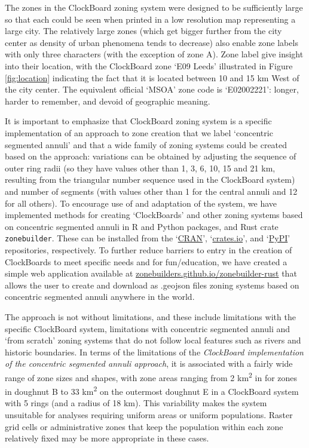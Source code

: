 \documentclass{josis}
\begin{document}
The zones in the ClockBoard zoning system were designed to be sufficiently large so that each could be seen when printed in a low resolution map representing a large city.
The relatively large zones (which get bigger further from the city center as density of urban phenomena tends to decrease) also enable zone labels with only three characters (with the exception of zone A).
Zone label give insight into their location, with the ClockBoard zone `E09 Leeds' illustrated in Figure \ref{fig:location} indicating the fact that it is located between 10 and 15 km West of the city center.
The equivalent official `MSOA' zone code is `E02002221': longer, harder to remember, and devoid of geographic meaning.

It is important to emphasize that ClockBoard zoning system is a specific implementation of an approach to zone creation that we label `concentric segmented annuli' and that a wide family of zoning systems could be created based on the approach: variations can be obtained by adjusting the sequence of outer ring radii (so they have values other than 1, 3, 6, 10, 15 and 21 km, resulting from the triangular number sequence used in the ClockBoard system) and number of segments (with values other than 1 for the central annuli and 12 for all others).
To encourage use of and adaptation of the system, we have implemented methods for creating `ClockBoards' and other zoning systems based on concentric segmented annuli in R and Python packages, and Rust crate \texttt{zonebuilder}.
These can be installed from the `\href{https://cran.r-project.org/package=zonebuilder}{CRAN}', `\href{https://crates.io/crates/zonebuilder}{crates.io}', and `\href{https://pypi.org/project/zonebuilder/}{PyPI}' repositories, respectively.
To further reduce barriers to entry in the creation of ClockBoards to meet specific needs and for fun/education, we have created a simple web application available at \href{https://zonebuilders.github.io/zonebuilder-rust/}{zonebuilders.github.io/zonebuilder-rust} that allows the user to create and download as .geojson files zoning systems based on concentric segmented annuli anywhere in the world.

The approach is not without limitations, and these include limitations with the specific ClockBoard system, limitations with concentric segmented annuli and `from scratch' zoning systems that do not follow local features such as rivers and historic boundaries.
In terms of the limitations of the \emph{ClockBoard implementation of the concentric segmented annuli approach}, it is associated with a fairly wide range of zone sizes and shapes, with zone areas ranging from 2 km\textsuperscript{2} in for zones in doughnut B to 33 km\textsuperscript{2} on the outermost doughnut E in a ClockBoard system with 5 rings (and a radius of 18 km).
This variability makes the system unsuitable for analyses requiring uniform areas or uniform populations.
Raster grid cells or administrative zones that keep the population within each zone relatively fixed may be more appropriate in these cases.
\end{document}
